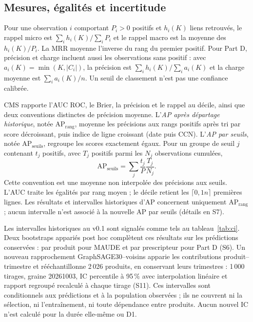 \subsection{Mesures, égalités et incertitude}
\label{sec:metrics}

Pour une observation $i$ comportant $P_i>0$ positifs et $h_i(K)$ liens retrouvés, le rappel micro est $\sum_i h_i(K)/\sum_i P_i$ et le rappel macro est la moyenne des $h_i(K)/P_i$. La MRR moyenne l'inverse du rang du premier positif. Pour Part D, précision et charge incluent aussi les observations sans positif : avec $a_i(K)=\min(K,|C_i|)$, la précision est $\sum_i h_i(K)/\sum_i a_i(K)$ et la charge moyenne est $\sum_i a_i(K)/n$. Un seuil de classement n'est pas une confiance calibrée.

CMS rapporte l'AUC ROC, le Brier, la précision et le rappel au décile, ainsi que deux conventions distinctes de précision moyenne. L'\emph{AP après départage historique}, notée $\mathrm{AP}_{\mathrm{rang}}$, moyenne les précisions aux rangs positifs après tri par score décroissant, puis indice de ligne croissant (date puis CCN). L'\emph{AP par seuils}, notée $\mathrm{AP}_{\mathrm{seuils}}$, regroupe les scores exactement égaux. Pour un groupe de seuil $j$ contenant $t_j$ positifs, avec $T_j$ positifs parmi les $N_j$ observations cumulées,
\begin{equation}
 \mathrm{AP}_{\mathrm{seuils}}=\sum_j\frac{t_j}{P}\frac{T_j}{N_j}.
\end{equation}
Cette convention est une moyenne non interpolée des précisions aux seuils\cite{sklearnap}. L'AUC traite les égalités par rang moyen ; le décile retient les $\lceil0,1n\rceil$ premières lignes. Les résultats et intervalles historiques d'AP concernent uniquement $\mathrm{AP}_{\mathrm{rang}}$ ; aucun intervalle n'est associé à la nouvelle AP par seuils (détails en S7).

Les intervalles historiques au v0.1 sont signalés comme tels au tableau~\ref{tab:ci}. Deux bootstraps appariés post hoc complètent ces résultats sur les prédictions conservées : par produit pour MAUDE et par prescripteur pour Part D (S6). Un nouveau rapprochement GraphSAGE30--voisins apparie les contributions produit--trimestre et rééchantillonne 2\,026 produits, en conservant leurs trimestres : 1\,000 tirages, graine 20261003, IC percentile à 95\,\% avec interpolation linéaire et rapport regroupé recalculé à chaque tirage (S11). Ces intervalles sont conditionnels aux prédictions et à la population observées ; ils ne couvrent ni la sélection, ni l'entraînement, ni toute dépendance entre produits. Aucun nouvel IC n'est calculé pour la durée elle-même ou D1.

